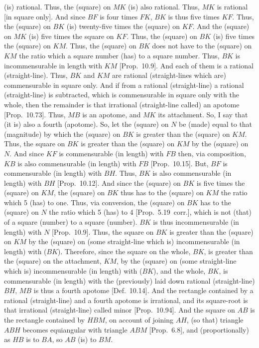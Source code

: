 (is) rational. Thus, the (square) on $MK$ (is) also rational. 
Thus, $MK$ is rational [in square only]. And since $BF$ is four times
$FK$, $BK$ is thus five times $KF$. Thus, the (square) on $BK$
(is) twenty-five times the (square) on $KF$.  And the (square) on $MK$
(is) five times the square on $KF$. Thus, the (square) on $BK$ (is) five
times the (square) on $KM$.  Thus, the (square) on $BK$ does not
have to the (square) on $KM$ the ratio which a square number (has) to
a square number. Thus, $BK$ is incommensurable in length with $KM$ [Prop.~10.9].
And each of them is a rational (straight-line).  Thus, $BK$ and $KM$ are rational
(straight-lines which are) commensurable in square only. And if from a rational (straight-line)
a rational (straight-line) is subtracted, which is commensurable in square
only with the whole, then the remainder is that irrational (straight-line
called) an apotome [Prop.~10.73]. Thus, $MB$ is an apotome, and $MK$ its attachment. So, I say that (it is) also a fourth (apotome). So, let the
(square) on $N$ be (made) equal to that (magnitude) by which the (square)
on $BK$ is greater than the (square) on $KM$. Thus, the
square on $BK$ is greater than the (square) on $KM$ by the (square) on $N$.
And since $KF$ is commensurable (in length) with $FB$ then, via composition, 
$KB$ is also commensurable (in length) with $FB$ [Prop.~10.15]. But, $BF$ is commensurable (in length)
with $BH$. Thus, $BK$ is also commensurable (in length) with $BH$ [Prop.~10.12]. And since the
(square) on $BK$ is five times the (square) on $KM$, the (square) on $BK$
thus has to the (square) on $KM$ the ratio which 5 (has) to one. Thus, via
conversion, the (square) on $BK$ has to the (square) on $N$ the ratio
which 5 (has) to 4 [Prop.~5.19~corr.], which is not (that) of a
square (number) to a square (number). $BK$ is thus incommensurable (in length)
with $N$ [Prop.~10.9]. Thus, the square on $BK$ is greater than
the (square) on $KM$ by the (square) on (some straight-line which is) incommensurable (in length) with ($BK$). Therefore, since the square on the whole,
$BK$, is greater than the (square) on the attachment, $KM$, by the
(square) on (some straight-line which is) incommensurable (in length) with ($BK$),
and the whole, $BK$, is commensurable (in length) with the (previously) laid down
rational (straight-line) $BH$, $MB$ is thus a fourth apotome
[Def.~10.14]. And the rectangle contained by a rational (straight-line)
and a fourth apotome is irrational, and its square-root is that irrational
(straight-line) called minor [Prop.~10.94]. And the square on $AB$
is the rectangle contained by $HBM$, on account of joining $AH$, (so that)
triangle $ABH$ becomes equiangular  with triangle $ABM$ [Prop.~6.8], and (proportionally) as
$HB$ is to $BA$, so $AB$ (is) to $BM$.

